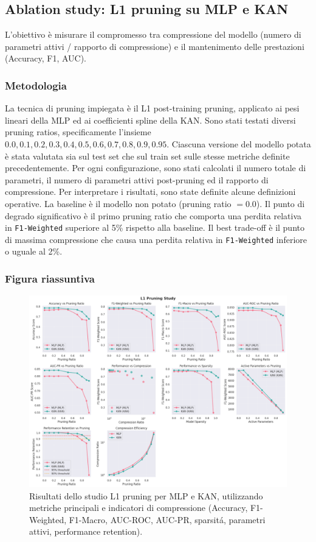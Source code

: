 \documentclass[a4paper,12pt]{report}
\begin{document}
	\subsection{Ablation study: L1 pruning su MLP e KAN}
	L'obiettivo è misurare il compromesso tra compressione del modello (numero di parametri attivi / rapporto di compressione) e il mantenimento delle prestazioni (Accuracy, F1, AUC).
	
	\subsubsection{Metodologia}
	La tecnica di pruning impiegata è il L1 post-training pruning, applicato ai pesi lineari della MLP ed ai coefficienti spline della KAN. Sono stati testati diversi pruning ratios, specificamente l'insieme ${0.0,0.1,0.2,0.3,0.4,0.5,0.6,0.7,0.8,0.9,0.95}$. Ciascuna versione del modello potata è stata valutata sia sul test set che sul train set sulle stesse metriche definite precedentemente. Per ogni configurazione, sono stati calcolati il numero totale di parametri, il numero di parametri attivi post-pruning ed il rapporto di compressione. Per interpretare i risultati, sono state definite alcune definizioni operative. La baseline è il modello non potato (pruning ratio $= 0.0$). Il punto di degrado significativo è il primo pruning ratio che comporta una perdita relativa in \texttt{F1-Weighted} superiore al 5\% rispetto alla baseline. Il best trade-off è il punto di massima compressione che causa una perdita relativa in \texttt{F1-Weighted} inferiore o uguale al 2\%.
	
	\subsubsection{Figura riassuntiva}
	\begin{figure}[H]
		\centering
		\includegraphics[width=1.0\textwidth]{img/abl_kanvsmlp_pm.png}
		\caption{Risultati dello studio L1 pruning per MLP e KAN, utilizzando metriche principali e indicatori di compressione (Accuracy, F1-Weighted, F1-Macro, AUC-ROC, AUC-PR, sparsitá, parametri attivi, performance retention).}
	\end{figure}
	
\end{document}
